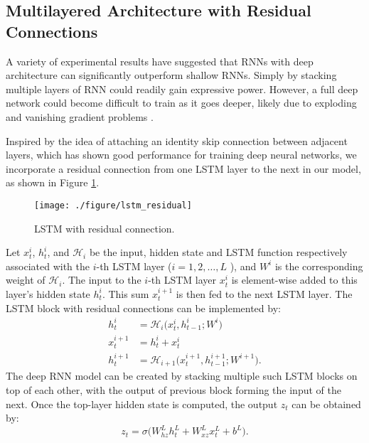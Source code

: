 \documentclass[letterpaper, 10 pt, conference]{ieeeconf}
\begin{document}
\subsection{Multilayered Architecture with Residual Connections}
A variety of experimental results \cite{graves2013speech}\cite{amodei2016deep} have suggested that RNNs with deep architecture can significantly outperform shallow RNNs.
Simply by stacking multiple layers of RNN could readily gain expressive power. However, a full deep network could become difficult to train as it goes deeper, likely due to exploding and vanishing gradient problems \cite{pascanu2013difficulty}.

Inspired by the idea of attaching an identity skip connection between adjacent layers, which
has shown good performance for training deep neural networks\cite{he2016deep}\cite{srivastava2015highway}\cite{wu2016google},
we incorporate a residual connection from one LSTM layer to the next in our model, as shown in Figure \ref{fig:residual}.
\begin{figure}[h]
\centering
\texttt{[image: ./figure/lstm\_residual]}
\caption{LSTM with residual connection.}
\label{fig:residual}
\end{figure}
Let $x_t^{i} $, $h_t^{i} $, and $\mathcal{H}_i$ be the input, hidden state and LSTM function respectively associated with the $ i$-th LSTM layer ($ i = 1,2,\dots, L $ ), and $W^{i} $ is the corresponding weight of  $\mathcal{H}_i$.
The input to the $ i$-th LSTM layer $ x_t^{i}  $ is element-wise added to this layer's hidden state $ h_{t}^{i} $. This sum $x_t^{i+1}  $ is then fed to the next LSTM layer.
The LSTM block with residual connections can be implemented by:
\begin{align}
h_{t}^{i} & = \mathcal{H}_i \big( x_{t}^{i},  h_{t-1}^{i};  W^{i} \big)  \label{eq:11}\\
x_t^{i+1} & = h_{t}^{i} + x_t^{i} \label{eq:12} \\
h_{t}^{i+1} & = \mathcal{H}_{i+1} \big( x_{t}^{i+1},  h_{t-1}^{i+1};  W^{i+1} \big) \label{eq:13}.
\end{align}
The deep RNN model can be created by stacking multiple such LSTM blocks on top of each other, with the output of previous block  forming the input of the next.
Once the top-layer hidden state is computed, the output $ z_t $ can be obtained by:
\begin{equation}
z_{t}  = \sigma \big( W_{hz}^{L} h_{t}^{L} + W_{xz}^{L} x_{t}^{L} +  b^{L} \big) \label{eq:14} .
\end{equation} 
\end{document}
